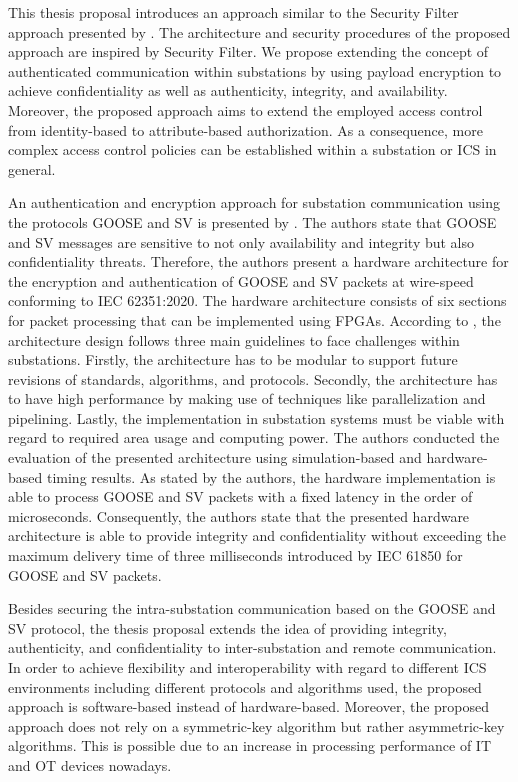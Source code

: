 This thesis proposal introduces an approach similar to the Security Filter approach presented by \citeauthor{Ishchenko2018}.
The architecture and security procedures of the proposed approach are inspired by Security Filter.
We propose extending the concept of authenticated communication within substations by using payload encryption to achieve confidentiality as well as authenticity, integrity, and availability.
Moreover, the proposed approach aims to extend the employed access control from identity-based to attribute-based authorization.
As a consequence, more complex access control policies can be established within a substation or ICS in general.

An authentication and encryption approach for substation communication using the protocols GOOSE and SV is presented by \citeauthor{Rodriguez2021} \cite{Rodriguez2021}.
The authors state that GOOSE and SV messages are sensitive to not only availability and integrity but also confidentiality threats.
Therefore, the authors present a hardware architecture for the encryption and authentication of GOOSE and SV packets at wire-speed conforming to IEC 62351:2020.
The hardware architecture consists of six sections for packet processing that can be implemented using FPGAs.
According to \citeauthor{Rodriguez2021}, the architecture design follows three main guidelines to face challenges within substations.
Firstly, the architecture has to be modular to support future revisions of standards, algorithms, and protocols.
Secondly, the architecture has to have high performance by making use of techniques like parallelization and pipelining.
Lastly, the implementation in substation systems must be viable with regard to required area usage and computing power.
The authors conducted the evaluation of the presented architecture using simulation-based and hardware-based timing results.
As stated by the authors, the hardware implementation is able to process GOOSE and SV packets with a fixed latency in the order of microseconds.
Consequently, the authors state that the presented hardware architecture is able to provide integrity and confidentiality without exceeding the maximum delivery time of three milliseconds introduced by IEC 61850 for GOOSE and SV packets.

Besides securing the intra-substation communication based on the GOOSE and SV protocol, the thesis proposal extends the idea of providing integrity, authenticity, and confidentiality to inter-substation and remote communication.
In order to achieve flexibility and interoperability with regard to different ICS environments including different protocols and algorithms used, the proposed approach is software-based instead of hardware-based.
Moreover, the proposed approach does not rely on a symmetric-key algorithm but rather asymmetric-key algorithms.
This is possible due to an increase in processing performance of IT and OT devices nowadays.

